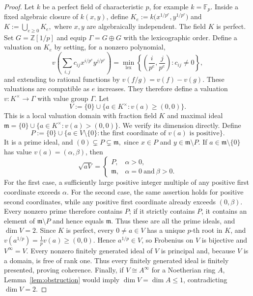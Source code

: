 \documentclass[11pt,a4paper]{amsart}
\numberwithin{equation}{section}
\newcommand{\ZZ}{\mathbb Z}
\begin{document}
 \begin{proof}
 Let $k$ be a perfect field of characteristic $p$, for example
 $k=\mathbb F_p$. Inside a fixed algebraic closure of $k(x,y)$, define
$K_e:=k\bigl(x^{1/p^e},y^{1/p^e}\bigr)$ and $K:=\bigcup_{e\geq0}K_e,	$ 
where $x,y$ are algebraically independent.
The field $K$ is perfect.	Set $G=\ZZ[1/p]$ and equip $\Gamma=G\oplus G$ with the	lexicographic order. Define a valuation on $K_e$ by setting, for a	nonzero polynomial, 	$$ 	v\!\left(\sum_{i,j}c_{ij}x^{i/p^e}y^{j/p^e}\right)	=	\min_{\mathrm{lex}}
 	\left\{\left(\frac{i}{p^e},\frac{j}{p^e}\right):c_{ij}\neq0\right\},$$
 and extending to rational functions by
$v(f/g)=v(f)-v(g)$.
These valuations are compatible as $e$ increases. They therefore
define a valuation $v:K^\times\longrightarrow\Gamma$ with value
group $\Gamma$. Let
$$V:=\{0\}\cup\{a\in K^\times:v(a)\geq(0,0)\}.$$	This is a local valuation domain with fraction field $K$ and maximal	ideal $\mathfrak m=\{0\}\cup\{a\in K^\times:v(a)>(0,0)\}.	$	We verify its dimension directly. Define 	$$	P:=\{0\}\cup
 	\{a\in V\setminus\{0\}:\text{the first coordinate of }v(a)
 	\text{ is positive}\}.	$$
It is a prime ideal, and	$	(0)\subsetneq P\subsetneq\mathfrak m, $	since $x\in P$ and $y\in\mathfrak m\setminus P$.	If $a\in\mathfrak m\setminus\{0\}$ has value	$v(a)=(\alpha,\beta)$, then	$$	\sqrt{aV}=	\begin{cases}		P,&\alpha>0,\\
 		\mathfrak m,&\alpha=0\ \text{and}\ \beta>0.
\end{cases}	$$	For the first case, a sufficiently large positive integer multiple of	any positive first coordinate exceeds $\alpha$. For the second case,	the same assertion holds for positive second coordinates, while any 	positive first coordinate already exceeds $(0,\beta)$. 	Every nonzero prime therefore contains $P$; if it strictly contains 	$P$, it contains an element of $\mathfrak m\setminus P$ and hence 	equals $\mathfrak m$. Thus these are all the prime ideals, and 	$\dim V=2$.	Since $K$ is perfect, every $0\neq a\in V$ has a unique $p$-th root 	in $K$, and 	$	v(a^{1/p})=\frac{1}{p}v(a)\geq(0,0).$	Hence $a^{1/p}\in V$, so Frobenius on $V$ is bijective and	$V^\infty=V$.	Every nonzero finitely generated ideal of $V$ is principal and,	because $V$ is a domain, is free of rank one. Thus every finitely 	generated ideal is finitely presented, proving coherence. 	Finally, if $V\cong A^\infty$ for a Noetherian ring $A$, 	Lemma~\ref{lem:obstruction} would imply 	$\dim V=\dim A\leq1$, contradicting $\dim V=2$.
 \end{proof}
 
\end{document}
